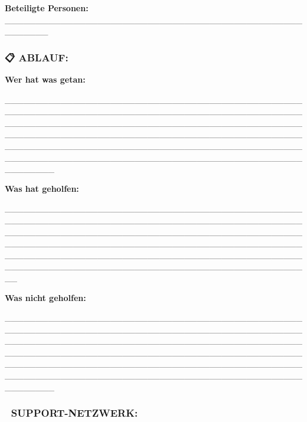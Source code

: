 \textbf{Beteiligte Personen:} \_\_\_\_\_\_\_\_\_\_\_\_\_\_\_\_\_\_\_\_\_\_\_\_\_\_\_\_\_\_\_\_\_\_\_\_\_\_\_\_\_\_\_\_\_\_\_\_\_\_\_\_\_\_\_

\hypertarget{ablauf}{%
\subsubsection{\texorpdfstring{\textbf{📋 ABLAUF:}}{📋 ABLAUF:}}\label{ablauf}}

\textbf{Wer hat was getan:}

\_\_\_\_\_\_\_\_\_\_\_\_\_\_\_\_\_\_\_\_\_\_\_\_\_\_\_\_\_\_\_\_\_\_\_\_\_\_\_\_\_\_\_\_\_\_\_\_\_\_\_\_\_\_\_\_\_\_\_\_\_\_\_\_\_\_\_\_\_\_\_\_\_\_\_\_\_\_\_\_\_\_\_\_\_\_\_\_\_\_\_\_\_\_\_\_\_\_\_\_\_\_\_\_\_\_\_\_\_\_\_\_\_\_\_\_\_\_\_\_\_\_\_\_\_\_\_\_\_\_\_\_\_\_\_\_\_\_\_\_\_\_\_\_\_\_\_\_\_\_\_\_\_\_\_\_\_\_\_\_\_\_\_\_\_\_\_\_\_\_\_\_\_\_\_\_\_\_\_\_\_\_\_\_\_\_\_\_\_\_\_\_\_\_\_\_\_\_\_\_\_\_\_\_\_\_\_\_\_\_\_\_\_\_\_\_\_\_\_\_\_\_\_\_\_\_\_\_\_\_\_\_\_\_\_\_\_\_\_\_\_\_\_\_\_\_\_\_\_\_\_\_\_\_\_\_\_\_\_\_\_\_\_\_\_\_\_\_\_\_\_\_\_\_\_\_\_\_\_\_\_\_\_\_\_\_\_\_\_\_\_\_\_\_\_\_

\textbf{Was hat geholfen:}

\_\_\_\_\_\_\_\_\_\_\_\_\_\_\_\_\_\_\_\_\_\_\_\_\_\_\_\_\_\_\_\_\_\_\_\_\_\_\_\_\_\_\_\_\_\_\_\_\_\_\_\_\_\_\_\_\_\_\_\_\_\_\_\_\_\_\_\_\_\_\_\_\_\_\_\_\_\_\_\_\_\_\_\_\_\_\_\_\_\_\_\_\_\_\_\_\_\_\_\_\_\_\_\_\_\_\_\_\_\_\_\_\_\_\_\_\_\_\_\_\_\_\_\_\_\_\_\_\_\_\_\_\_\_\_\_\_\_\_\_\_\_\_\_\_\_\_\_\_\_\_\_\_\_\_\_\_\_\_\_\_\_\_\_\_\_\_\_\_\_\_\_\_\_\_\_\_\_\_\_\_\_\_\_\_\_\_\_\_\_\_\_\_\_\_\_\_\_\_\_\_\_\_\_\_\_\_\_\_\_\_\_\_\_\_\_\_\_\_\_\_\_\_\_\_\_\_\_\_\_\_\_\_\_\_\_\_\_\_\_\_\_\_\_\_\_\_\_\_\_\_\_\_\_\_\_\_\_\_\_\_\_\_\_\_\_\_\_\_\_\_\_\_\_\_\_\_\_\_\_\_\_\_\_\_\_\_\_\_\_

\textbf{Was nicht geholfen:}

\_\_\_\_\_\_\_\_\_\_\_\_\_\_\_\_\_\_\_\_\_\_\_\_\_\_\_\_\_\_\_\_\_\_\_\_\_\_\_\_\_\_\_\_\_\_\_\_\_\_\_\_\_\_\_\_\_\_\_\_\_\_\_\_\_\_\_\_\_\_\_\_\_\_\_\_\_\_\_\_\_\_\_\_\_\_\_\_\_\_\_\_\_\_\_\_\_\_\_\_\_\_\_\_\_\_\_\_\_\_\_\_\_\_\_\_\_\_\_\_\_\_\_\_\_\_\_\_\_\_\_\_\_\_\_\_\_\_\_\_\_\_\_\_\_\_\_\_\_\_\_\_\_\_\_\_\_\_\_\_\_\_\_\_\_\_\_\_\_\_\_\_\_\_\_\_\_\_\_\_\_\_\_\_\_\_\_\_\_\_\_\_\_\_\_\_\_\_\_\_\_\_\_\_\_\_\_\_\_\_\_\_\_\_\_\_\_\_\_\_\_\_\_\_\_\_\_\_\_\_\_\_\_\_\_\_\_\_\_\_\_\_\_\_\_\_\_\_\_\_\_\_\_\_\_\_\_\_\_\_\_\_\_\_\_\_\_\_\_\_\_\_\_\_\_\_\_\_\_\_\_\_\_\_\_\_\_\_\_\_\_\_\_\_\_\_

\hypertarget{support-netzwerk}{%
\subsubsection{\texorpdfstring{\textbf{👥 SUPPORT-NETZWERK:}}{👥 SUPPORT-NETZWERK:}}\label{support-netzwerk}}

